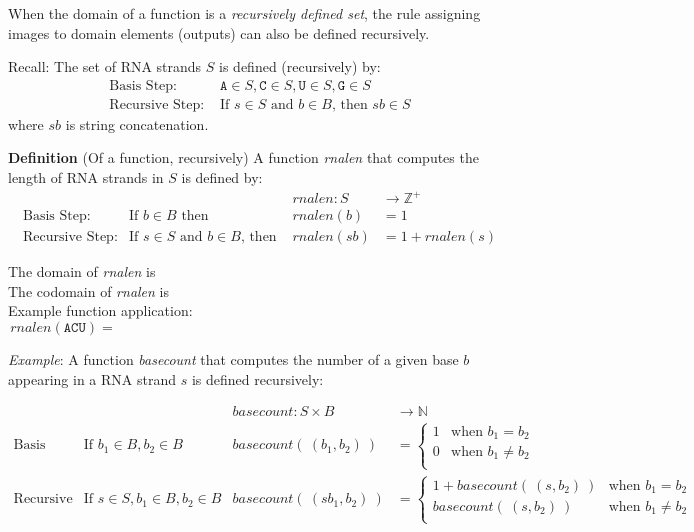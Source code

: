 \documentclass[12pt, oneside]{article}
\newcommand{\A}[0]{\texttt{A}}
\newcommand{\C}[0]{\texttt{C}}
\newcommand{\G}[0]{\texttt{G}}
\newcommand{\U}[0]{\texttt{U}}
\begin{document}
When the domain of a function is a {\it recursively defined set}, the rule assigning 
images to domain elements (outputs) can also be defined recursively.

Recall: The set of RNA strands $S$ is defined (recursively) by:
\[
\begin{array}{ll}
\textrm{Basis Step: } & \A \in S, \C \in S, \U \in S, \G \in S \\
\textrm{Recursive Step: } & \textrm{If } s \in S\textrm{ and }b \in B \textrm{, then }sb \in S
\end{array}
\]
where $sb$ is string concatenation.

{\bf Definition} (Of a function, recursively) A function \textit{rnalen} that computes the length of RNA strands in $S$ is defined by:
\[
\begin{array}{llll}
& & \textit{rnalen} : S & \to \mathbb{Z}^+ \\
\textrm{Basis Step:} & \textrm{If } b \in B\textrm{ then } & \textit{rnalen}(b) & = 1 \\
\textrm{Recursive Step:} & \textrm{If } s \in S\textrm{ and }b \in B\textrm{, then  } & \textit{rnalen}(sb) & = 1 + \textit{rnalen}(s)
\end{array}
\]

The domain of \textit{rnalen} is \phantom{$S$}\\

The codomain of \textit{rnalen} is \\

Example function application:
\[
rnalen(\A\C\U) = \phantom{1+ rnalen(\A\C) = 1 + (1 + rnalen(\A) ) = 1 + ( 1 + 1) = 3}
\]

\vfill

{\it Example}: A function \textit{basecount} that computes the number of a given base 
$b$ appearing in a RNA strand $s$ is defined recursively:
    
\[
\begin{array}{llll}
& & \textit{basecount} : S \times B & \to \mathbb{N} \\
\textrm{Basis Step:} &  \textrm{If } b_1 \in B, b_2 \in B & \textit{basecount}(~(b_1, b_2)~) & =
        \begin{cases}
            1 & \textrm{when } b_1 = b_2 \\
            0 & \textrm{when } b_1 \neq b_2 \\
        \end{cases} \\
\textrm{Recursive Step:} & \textrm{If } s \in S, b_1 \in B, b_2 \in B &\textit{basecount}(~(s b_1, b_2)~) & =
        \begin{cases}
            1 + \textit{basecount}(~(s, b_2)~) & \textrm{when } b_1 = b_2 \\
            \textit{basecount}(~(s, b_2)~) & \textrm{when } b_1 \neq b_2 \\
        \end{cases}
\end{array}
\]
\end{document}
